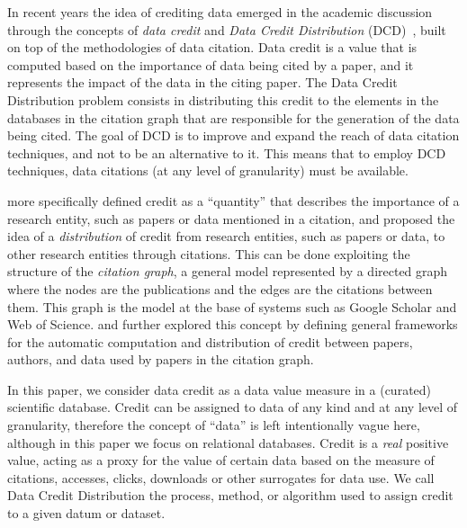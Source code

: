 
In recent years the idea of crediting data emerged in the academic discussion through the concepts of \emph{data credit} and \emph{Data Credit Distribution} (DCD)~\citep{creditFang18,transitiveCreditKatz2014,zeng2020assigning}, built on top of the methodologies of data citation. 
Data credit is a value that is computed based on the importance of data being cited by a paper, and it represents the impact of the data in the citing paper. 
The Data Credit Distribution problem consists in distributing this credit to the elements in the databases in the citation graph that are responsible for the generation of the data being cited. The goal of DCD is to improve and expand the reach of data citation techniques, and not to be an alternative to it. This means that to employ DCD techniques, data citations (at any level of granularity) must be available.

\cite{katz2020SoftwareandData} more specifically defined credit as a ``quantity'' that describes the importance of a research entity, such as papers or data mentioned in a citation, and proposed the idea of a \emph{distribution} of credit from research entities, such as papers or data, to other research entities through citations. 
This can be done exploiting the structure of the \emph{citation graph}, a general model represented by a directed graph where the nodes are the publications and the edges are the citations between them.
This graph is the model at the base of systems such as Google Scholar and Web of Science.
\cite{zeng2020assigning} and \cite{creditFang18} further explored this concept by defining general frameworks for the automatic computation and distribution of credit between papers, authors, and data used by papers in the citation graph. 

In this paper, we consider data credit as a data value measure in a (curated) scientific database. Credit can be assigned to data of any kind and at any level of granularity, therefore the concept of ``data'' is left intentionally vague here, although in this paper we focus on relational databases.
Credit is a \emph{real} positive value, acting as a proxy for the value of certain data based on the measure of citations, accesses, clicks, downloads or other surrogates for data use. We call Data Credit Distribution the process, method, or algorithm used to assign credit to a given datum or dataset.

